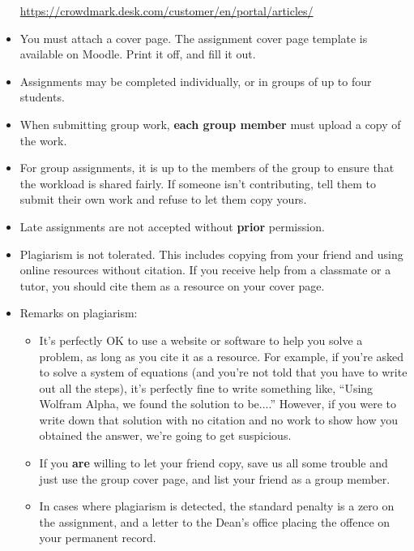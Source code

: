 \documentclass[letterpaper,12pt]{article}
\begin{document}
\begin{itemize}
 \href{https://crowdmark.desk.com/customer/en/portal/articles/}{https://crowdmark.desk.com/customer/en/portal/articles/}
 \item You must attach a cover page. The assignment cover page template is available on Moodle. Print it off, and fill it out. 
 \item Assignments may be completed individually, or in groups of up to four students. 
 \item When submitting group work, \textbf{each group member} must upload a copy of the work.
 \item For group assignments, it is up to the members of the group to ensure that the workload is shared fairly. If someone isn't contributing, tell them to submit their own work and refuse to let them copy yours.
 \item Late assignments are not accepted without {\bf prior} permission. 
 \item Plagiarism is not tolerated. This includes copying from your friend and using online resources without citation. If you receive help from a classmate or a tutor, you should cite them as a resource on your cover page.
 \item Remarks on plagiarism:
\begin{itemize}
 \item It's perfectly OK to use a website or software to help you solve a problem, as long as you cite it as a resource. For example, if you're asked to solve a system of equations (and you're not told that you have to write out all the steps), it's perfectly fine to write something like, ``Using Wolfram Alpha, we found the solution to be....'' However, if you were to write down that solution with no citation and no work to show how you obtained the answer, we're going to get suspicious.
 \item If you \textbf{are} willing to let your friend copy, save us all some trouble and just use the group cover page, and list your friend as a group member.
 \item In cases where plagiarism is detected, the standard penalty is a zero on the assignment, and a letter to the Dean's office placing the offence on your permanent record.
\end{itemize}


\end{itemize}
\end{document}
